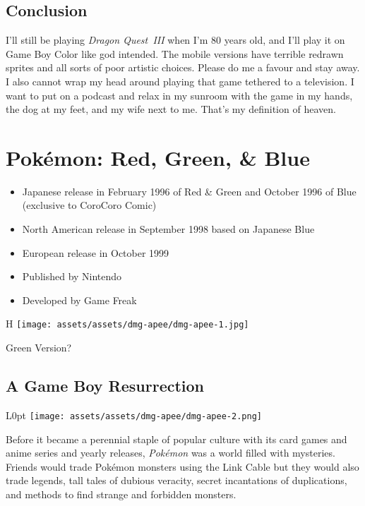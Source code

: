 \documentclass{book}
\begin{document}
\FloatBarrier\needspace{10mm}\section*{Conclusion}\nopagebreak[4]

I’ll still be playing \emph{Dragon Quest III} when I’m 80 years old, and I’ll play it on Game Boy Color like god intended. The mobile versions have terrible redrawn sprites and all sorts of poor artistic choices. Please do me a favour and stay away. I also cannot wrap my head around playing that game tethered to a television. I want to put on a podcast and relax in my sunroom with the game in my hands, the dog at my feet, and my wife next to me. That’s my definition of heaven.


\begingroup \chapter*{Pokémon: Red, Green, \& Blue} \endgroup

\begin{itemize} \setlength\itemsep{-0.4em}
\item Japanese release in February 1996 of Red \& Green and October 1996 of Blue (exclusive to CoroCoro Comic)
\item North American release in September 1998 based on Japanese Blue
\item European release in October 1999
\item Published by Nintendo
\item Developed by Game Freak
\end{itemize}\noindent

\begin{wrapfigure}{H}{\linewidth}
\vskip 4pt
\centering \texttt{[image: assets/assets/dmg-apee/dmg-apee-1.jpg]}\par\pagetwodescription Green Version?\end{wrapfigure}
\clearpage

\FloatBarrier\needspace{10mm}\section*{A Game Boy Resurrection}\nopagebreak[4]

\begin{wrapfigure}{L}{0pt} \texttt{[image: assets/assets/dmg-apee/dmg-apee-2.png]}\end{wrapfigure}
Before it became a perennial staple of popular culture with its card games and anime series and yearly releases, \emph{Pokémon} was a world filled with mysteries. Friends would trade Pokémon monsters using the Link Cable but they would also trade legends, tall tales of dubious veracity, secret incantations of duplications, and methods to find strange and forbidden monsters.
\end{document}
